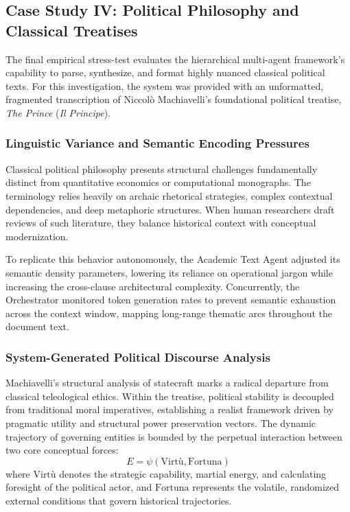 \subsection{Case Study IV: Political Philosophy and Classical Treatises}
The final empirical stress-test evaluates the hierarchical multi-agent framework's capability to parse, synthesize, and format highly nuanced classical political texts. For this investigation, the system was provided with an unformatted, fragmented transcription of Niccolò Machiavelli's foundational political treatise, \textit{The Prince} (\textit{Il Principe}).

\subsubsection{Linguistic Variance and Semantic Encoding Pressures}
Classical political philosophy presents structural challenges fundamentally distinct from quantitative economics or computational monographs. The terminology relies heavily on archaic rhetorical strategies, complex contextual dependencies, and deep metaphoric structures. When human researchers draft reviews of such literature, they balance historical context with conceptual modernization. 

To replicate this behavior autonomously, the Academic Text Agent adjusted its semantic density parameters, lowering its reliance on operational jargon while increasing the cross-clause architectural complexity. Concurrently, the Orchestrator monitored token generation rates to prevent semantic exhaustion across the context window, mapping long-range thematic arcs throughout the document text.

\subsubsection{System-Generated Political Discourse Analysis}
Machiavelli's structural analysis of statecraft marks a radical departure from classical teleological ethics. Within the treatise, political stability is decoupled from traditional moral imperatives, establishing a realist framework driven by pragmatic utility and structural power preservation vectors. The dynamic trajectory of governing entities is bounded by the perpetual interaction between two core conceptual forces:
\begin{equation}
E = \psi(\text{Virt\`u}, \text{Fortuna})
\end{equation}
where \(\text{Virt\`u}\) denotes the strategic capability, martial energy, and calculating foresight of the political actor, and \(\text{Fortuna}\) represents the volatile, randomized external conditions that govern historical trajectories.

